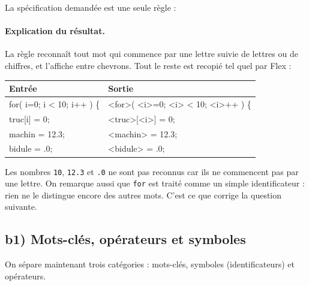 \documentclass[11pt,a4paper]{article}
\begin{document}
La spécification demandée est une seule règle :

\paragraph{Explication du résultat.}
La règle reconnaît tout mot qui commence par une lettre suivie de lettres ou de chiffres, et
l'affiche entre chevrons. Tout le reste est recopié tel quel par Flex :

\begin{center}
\begin{tabular}{>{\ttfamily}l >{\ttfamily}l}
\toprule
\textbf{\color{navy}Entrée} & \textbf{\color{navy}Sortie} \\
\midrule
for( i=0; i < 10; i++ ) \{ & <for>( <i>=0; <i> < 10; <i>++ ) \{ \\
truc[i] = 0;               & <truc>[<i>] = 0; \\
machin = 12.3;             & <machin> = 12.3; \\
bidule = .0;               & <bidule> = .0; \\
\bottomrule
\end{tabular}
\end{center}

Les nombres \texttt{10}, \texttt{12.3} et \texttt{.0} ne sont pas reconnus car ils ne commencent
pas par une lettre. On remarque aussi que \texttt{for} est traité comme un simple identificateur :
rien ne le distingue encore des autres mots. C'est ce que corrige la question suivante.

\subsection{b1) Mots-clés, opérateurs et symboles}

On sépare maintenant trois catégories : mots-clés, symboles (identificateurs) et opérateurs.
\end{document}
